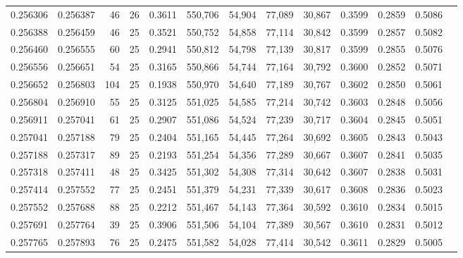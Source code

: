 \begin{tabular}{rrrrrrrrrrrrr}
0.256306 & 0.256387 &    46 &  26 &                                     0.3611 & 550,706 &  54,904 &  77,089 &  30,867 & 0.3599 & 0.2859 & 0.5086 \\
0.256388 & 0.256459 &    46 &  25 &                                     0.3521 & 550,752 &  54,858 &  77,114 &  30,842 & 0.3599 & 0.2857 & 0.5082 \\
0.256460 & 0.256555 &    60 &  25 &                                     0.2941 & 550,812 &  54,798 &  77,139 &  30,817 & 0.3599 & 0.2855 & 0.5076 \\
0.256556 & 0.256651 &    54 &  25 &                                     0.3165 & 550,866 &  54,744 &  77,164 &  30,792 & 0.3600 & 0.2852 & 0.5071 \\
0.256652 & 0.256803 &   104 &  25 &                                     0.1938 & 550,970 &  54,640 &  77,189 &  30,767 & 0.3602 & 0.2850 & 0.5061 \\
0.256804 & 0.256910 &    55 &  25 &                                     0.3125 & 551,025 &  54,585 &  77,214 &  30,742 & 0.3603 & 0.2848 & 0.5056 \\
0.256911 & 0.257041 &    61 &  25 &                                     0.2907 & 551,086 &  54,524 &  77,239 &  30,717 & 0.3604 & 0.2845 & 0.5051 \\
0.257041 & 0.257188 &    79 &  25 &                                     0.2404 & 551,165 &  54,445 &  77,264 &  30,692 & 0.3605 & 0.2843 & 0.5043 \\
0.257188 & 0.257317 &    89 &  25 &                                     0.2193 & 551,254 &  54,356 &  77,289 &  30,667 & 0.3607 & 0.2841 & 0.5035 \\
0.257318 & 0.257411 &    48 &  25 &                                     0.3425 & 551,302 &  54,308 &  77,314 &  30,642 & 0.3607 & 0.2838 & 0.5031 \\
0.257414 & 0.257552 &    77 &  25 &                                     0.2451 & 551,379 &  54,231 &  77,339 &  30,617 & 0.3608 & 0.2836 & 0.5023 \\
0.257552 & 0.257688 &    88 &  25 &                                     0.2212 & 551,467 &  54,143 &  77,364 &  30,592 & 0.3610 & 0.2834 & 0.5015 \\
0.257691 & 0.257764 &    39 &  25 &                                     0.3906 & 551,506 &  54,104 &  77,389 &  30,567 & 0.3610 & 0.2831 & 0.5012 \\
0.257765 & 0.257893 &    76 &  25 &                                     0.2475 & 551,582 &  54,028 &  77,414 &  30,542 & 0.3611 & 0.2829 & 0.5005 \\

\end{tabular}
